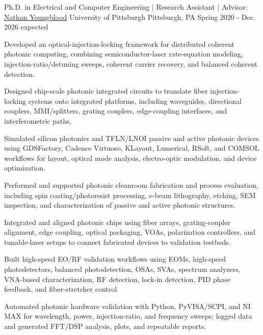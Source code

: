 
\begin{cventries}

  \cventry
    {Ph.D. in Electrical and Computer Engineering | Research Assistant | Advisor: \href{https://pitt-photonics.github.io/}{Nathan Youngblood}}
    {University of Pittsburgh}
    {Pittsburgh, PA}
    {Spring 2020 - Dec. 2026 expected}
    {
      \begin{cvitems}
        \item {Developed an optical-injection-locking framework for distributed coherent photonic computing, combining semiconductor-laser rate-equation modeling, injection-ratio/detuning sweeps, coherent carrier recovery, and balanced coherent detection.}
        \item {Designed chip-scale photonic integrated circuits to translate fiber injection-locking systems onto integrated platforms, including waveguides, directional couplers, MMI/splitters, grating couplers, edge-coupling interfaces, and interferometric paths.}
        \item {Simulated silicon photonics and TFLN/LNOI passive and active photonic devices using GDSFactory, Cadence Virtuoso, KLayout, Lumerical, RSoft, and COMSOL workflows for layout, optical mode analysis, electro-optic modulation, and device optimization.}
        \item {Performed and supported photonic cleanroom fabrication and process evaluation, including spin coating/photoresist processing, e-beam lithography, etching, SEM inspection, and characterization of passive and active photonic structures.}
        \item {Integrated and aligned photonic chips using fiber arrays, grating-coupler alignment, edge coupling, optical packaging, VOAs, polarization controllers, and tunable-laser setups to connect fabricated devices to validation testbeds.}
        \item {Built high-speed EO/RF validation workflows using EOMs, high-speed photodetectors, balanced photodetection, OSAs, SVAs, spectrum analyzers, VNA-based characterization, RF detection, lock-in detection, PID phase feedback, and fiber-stretcher control.}
        \item {Automated photonic hardware validation with Python, PyVISA/SCPI, and NI MAX for wavelength, power, injection-ratio, and frequency sweeps; logged data and generated FFT/DSP analysis, plots, and repeatable reports.}
      \end{cvitems}
    }


\end{cventries}
